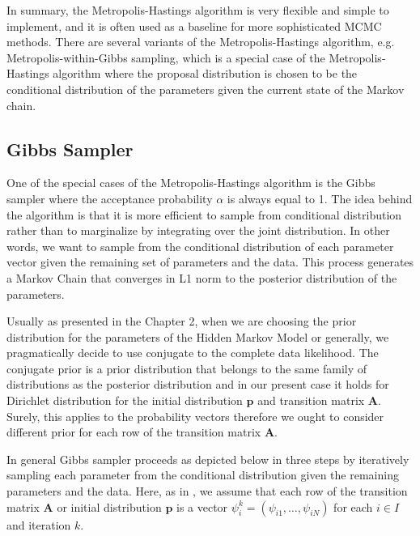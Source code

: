 In summary, the Metropolis-Hastings algorithm is very flexible and simple to implement, and it is often used as a baseline for more sophisticated MCMC methods. 
There are several variants of the Metropolis-Hastings algorithm, e.g. Metropolis-within-Gibbs sampling, which is a special case of the Metropolis-Hastings algorithm where the proposal distribution is chosen to be the conditional distribution of the parameters given the current state of the Markov chain.

\subsection{Gibbs Sampler}

One of the special cases of the Metropolis-Hastings algorithm is the Gibbs sampler where the acceptance probability 
$\alpha$ is always equal to 1. The idea behind the algorithm is that it is more efficient to sample from conditional distribution rather than 
to marginalize by integrating over the joint distribution. In other words, we want to sample from the conditional distribution of each parameter vector given 
the remaining set of parameters and the data. This process generates a Markov Chain that converges in L1 norm to the posterior distribution of the parameters. \citep{Chib1996}

Usually as presented in the Chapter 2, when we are choosing the prior distribution for the parameters of the Hidden Markov Model or generally, we pragmatically
decide to use conjugate to the complete data likelihood. The conjugate prior is a prior distribution that belongs to the same family of distributions 
as the posterior distribution and in our present case it holds for Dirichlet distribution for the initial distribution $\textbf{p}$ and transition matrix $\textbf{A}$.
Surely, this applies to the probability vectors therefore we ought to consider different prior for each row of the transition matrix $\textbf{A}$. \citep{Rydén2008}

In general Gibbs sampler proceeds as depicted below in three steps by iteratively sampling each parameter from the conditional distribution given the remaining parameters 
and the data. Here, as in \citep{Chib1996}, we assume that each row of the transition matrix $\textbf{A}$ or initial distribution $\textbf{p}$ is a vector $\psi_i^k=(\psi_{i1},\ldots,\psi_{iN})$ for each $i \in I$ and iteration $k$.

